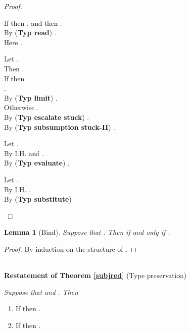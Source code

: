 \documentclass{sigplanconf}
\newcommand{\trule}[1]{(\textbf{Typ #1})}
\newtheorem{lemma}[definition]{Lemma}
\begin{document}
\begin{proof}
\begin{description}
If  then , and then .\\
By \trule{read} .\\
Here .\\
\item[Case (Typ limit)]

Let .\\
Then .\\
If  then\\
 .\\
 By \trule{limit} .\\
Otherwise .\\
By \trule{escalate stuck} .\\
By \trule{subsumption stuck-II} .\\
\item[Case (Typ evaluate)]

Let .\\
By I.H.  and .\\
By \trule{evaluate} .\\
\item[Case (Typ substitute)]

Let .\\
By I.H. .\\
By \trule{substitute} \qedhere
\end{description}
\end{proof}
\begin{lemma}[Bind]\label{application} Suppose that . Then  if and only if .
\end{lemma}
\begin{proof} By induction on the structure of .
\end{proof}
\\
{\bf Restatement of Theorem \ref{subjred}} (Type preservation) {\em
  Suppose that  and . Then \begin{enumerate}
\item If  then .
\item If  then .
\end{enumerate}
}
\end{document}
